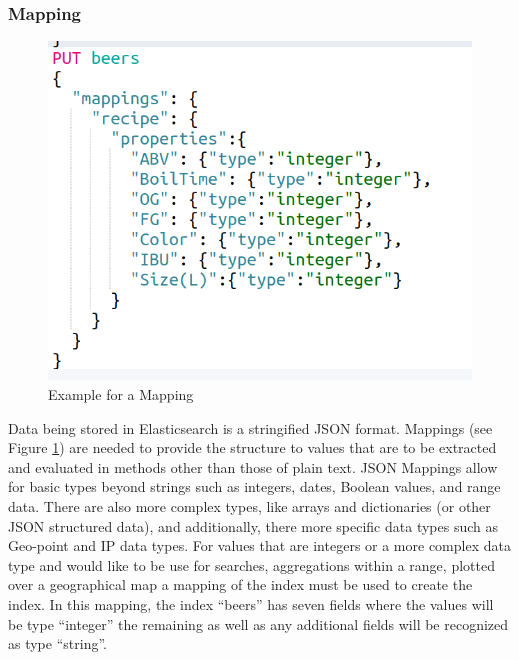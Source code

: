 \documentclass[bibliography=totoc]{article}
\begin{document}
\subsubsection{Mapping}
\begin{figure}
    \includegraphics[height=0.7\textwidth]{beer_mapping.png}
    \caption{\label{beer_mapping}Example for a Mapping} 
 \end{figure}
Data being stored in Elasticsearch is a stringified JSON format. 
Mappings (see Figure \ref{beer_mapping}) are needed to provide the structure to values that are to 
be extracted and evaluated in methods other than those of plain text. 
JSON Mappings allow for basic types beyond strings such as integers, dates, 
Boolean values, and range data.  
There are also more complex types, like arrays and dictionaries 
(or other JSON structured data), 
and additionally, there more specific data types such as Geo-point and 
IP data types.
For values that are integers or a more complex data type  and 
would like to be use for searches, aggregations within a range, 
plotted over a geographical map a mapping of the index must be 
used to create the index.
In this mapping, the index “beers” has seven fields where the values 
will be type “integer” the remaining as well as any additional fields will 
be recognized as type “string”.
\end{document}
